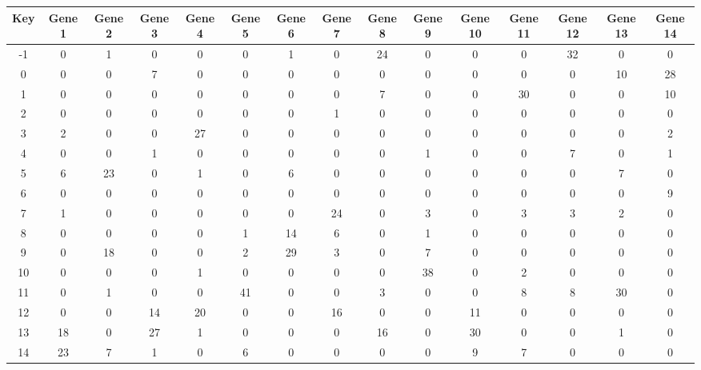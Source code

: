 \begin{tabular}{|c|c|c|c|c|c|c|c|c|c|c|c|c|c|c|}
\hline
Key & Gene 1 & Gene 2 & Gene 3 & Gene 4 & Gene 5 & Gene 6 & Gene 7 & Gene 8 & Gene 9 & Gene 10 & Gene 11 & Gene 12 & Gene 13 & Gene 14 \\
\hline
-1 & 0 & 1 & 0 & 0 & 0 & 1 & 0 & 24 & 0 & 0 & 0 & 32 & 0 & 0 \\
0 & 0 & 0 & 7 & 0 & 0 & 0 & 0 & 0 & 0 & 0 & 0 & 0 & 10 & 28 \\
1 & 0 & 0 & 0 & 0 & 0 & 0 & 0 & 7 & 0 & 0 & 30 & 0 & 0 & 10 \\
2 & 0 & 0 & 0 & 0 & 0 & 0 & 1 & 0 & 0 & 0 & 0 & 0 & 0 & 0 \\
3 & 2 & 0 & 0 & 27 & 0 & 0 & 0 & 0 & 0 & 0 & 0 & 0 & 0 & 2 \\
4 & 0 & 0 & 1 & 0 & 0 & 0 & 0 & 0 & 1 & 0 & 0 & 7 & 0 & 1 \\
5 & 6 & 23 & 0 & 1 & 0 & 6 & 0 & 0 & 0 & 0 & 0 & 0 & 7 & 0 \\
6 & 0 & 0 & 0 & 0 & 0 & 0 & 0 & 0 & 0 & 0 & 0 & 0 & 0 & 9 \\
7 & 1 & 0 & 0 & 0 & 0 & 0 & 24 & 0 & 3 & 0 & 3 & 3 & 2 & 0 \\
8 & 0 & 0 & 0 & 0 & 1 & 14 & 6 & 0 & 1 & 0 & 0 & 0 & 0 & 0 \\
9 & 0 & 18 & 0 & 0 & 2 & 29 & 3 & 0 & 7 & 0 & 0 & 0 & 0 & 0 \\
10 & 0 & 0 & 0 & 1 & 0 & 0 & 0 & 0 & 38 & 0 & 2 & 0 & 0 & 0 \\
11 & 0 & 1 & 0 & 0 & 41 & 0 & 0 & 3 & 0 & 0 & 8 & 8 & 30 & 0 \\
12 & 0 & 0 & 14 & 20 & 0 & 0 & 16 & 0 & 0 & 11 & 0 & 0 & 0 & 0 \\
13 & 18 & 0 & 27 & 1 & 0 & 0 & 0 & 16 & 0 & 30 & 0 & 0 & 1 & 0 \\
14 & 23 & 7 & 1 & 0 & 6 & 0 & 0 & 0 & 0 & 9 & 7 & 0 & 0 & 0 \\
\hline
\end{tabular}